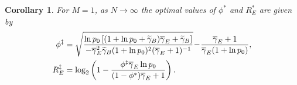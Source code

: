 \documentclass[journal]{IEEEtran}
\newtheorem{corollary}{\noindent \textbf{Corollary}}
\begin{document}
\begin{corollary}\label{co02}
For $M = 1$, as $N \rightarrow \infty$ the optimal values of $\phi^{\ast}$ and $R_E^{\ast}$ are given by
\begin{align}
\phi^{\ddag} &= \sqrt{\frac{\ln p_0 \left[(1 + \ln p_0 + \widetilde{\gamma}_B)\overline{\gamma}_E + \widetilde{\gamma}_B\right]}{-\overline{\gamma}_E^2 \widetilde{\gamma}_B (1+\ln p_0)^2(\overline{\gamma}_E + 1)^{-1}}} \!-\! \frac{\overline{\gamma}_E + 1}{\overline{\gamma}_E (1+\ln p_0)},\notag \\
R_E^{\ddag} &= \log_2\left(1-\frac{\phi^{\ddag} \overline{\gamma}_E \ln p_0}{(1-\phi^{\ast})\overline{\gamma}_E + 1}\right).\notag
\end{align}
\end{corollary}
\end{document}
